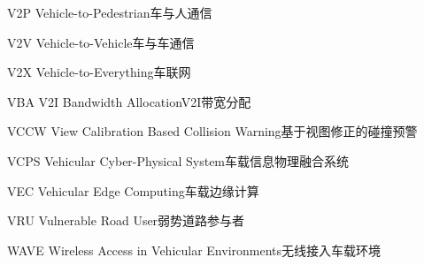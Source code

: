 \begin{abbreviate}[0mm][18mm]
\item[V2P] Vehicle-to-Pedestrian\hspace{1em}车与人通信
\item[V2V] Vehicle-to-Vehicle\hspace{1em}车与车通信
\item[V2X] Vehicle-to-Everything\hspace{1em}车联网
\item[VBA] V2I Bandwidth Allocation\hspace{1em}V2I带宽分配
\item[VCCW] View Calibration Based Collision Warning\hspace{1em}基于视图修正的碰撞预警
\item[VCPS] Vehicular Cyber-Physical System\hspace{1em}车载信息物理融合系统
\item[VEC] Vehicular Edge Computing\hspace{1em}车载边缘计算
\item[VRU] Vulnerable Road User\hspace{1em}弱势道路参与者
\item[WAVE] Wireless Access in Vehicular Environments\hspace{1em}无线接入车载环境
\end{abbreviate}
\endinput